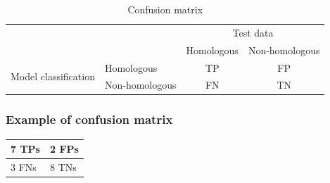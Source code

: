 \begin{table}[H]
\centering
\caption{Confusion matrix}
\begin{tabular}{ll|c|c|}
\cline{3-4}
                                                            &                & \multicolumn{2}{c|}{Test data}                                        \\ \cline{3-4} 
                                                            &                & \multicolumn{1}{l|}{Homologous} & \multicolumn{1}{l|}{Non-homologous} \\ \hline
\multicolumn{1}{|l|}{\multirow{2}{*}{Model classification}} & Homologous     & TP                              & FP                                  \\ \cline{2-4} 
\multicolumn{1}{|l|}{}                                      & Non-homologous & FN                              & TN                                  \\ \hline
\end{tabular}
\end{table}

%
%
\subsubsection*{Example of confusion matrix}

\begin{table}[H]
\centering
\begin{tabular}{|l|l|}
\hline
7 TPs & 2 FPs \\ \hline
3 FNs & 8 TNs \\ \hline
\end{tabular}
\end{table}

\bigskip 

%
